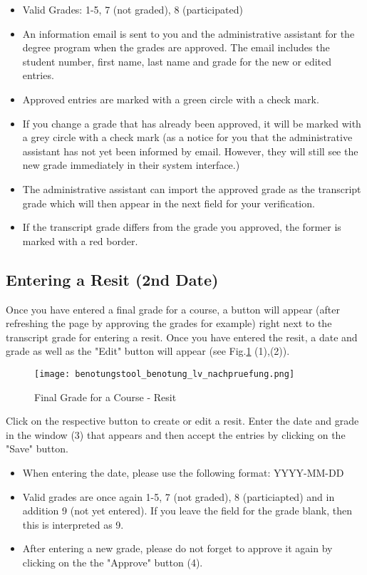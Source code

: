 \begin{itemize}
	\item Valid Grades: 1-5, 7 (not graded), 8 (participated)
	\item An information email is sent to you and the administrative assistant for the degree program when the grades are approved. The email includes the student number, first name, last name and grade for the new or edited entries.
	\item Approved entries are marked with a green circle with a check mark.
	\item If you change a grade that has already been approved, it will be marked with a grey circle with a check mark (as a notice for you that the administrative assistant has not yet been informed by email. However, they will still see the new grade immediately in their system interface.)
	\item The administrative assistant can import the approved grade as the transcript grade which will then appear in the next field for your verification.
	\item If the transcript grade differs from the grade you approved, the former is marked with a red border.
\end{itemize}

\subsection{Entering a Resit (2nd Date)}
\label{nachpruefung}

Once you have entered a final grade for a course, a button will appear (after refreshing the page by approving the grades for example) right next to the transcript grade for entering a resit. Once you have entered the resit, a date and grade as well as the "Edit" button will appear (see Fig.\ref{benotung_lv_nachpruefung_quick} (1),(2)).

\begin{figure}[ht]
\begin{center}
\texttt{[image: benotungstool\_benotung\_lv\_nachpruefung.png]}
\end{center}
\caption{Final Grade for a Course - Resit}\label{benotung_lv_nachpruefung_quick}
\end{figure}

Click on the respective button to create or edit a resit. Enter the date and grade in the window (3) that appears and then accept the entries by clicking on the "Save" button.

\begin{itemize}
    \item When entering the date, please use the following format: YYYY-MM-DD
    \item Valid grades are once again 1-5, 7 (not graded), 8 (particiapted) and in addition 9 (not yet entered). If you leave the field for the grade blank, then this is interpreted as 9.
    \item After entering a new grade, please do not forget to approve it again by clicking on the the "Approve" button (4).
\end{itemize}
